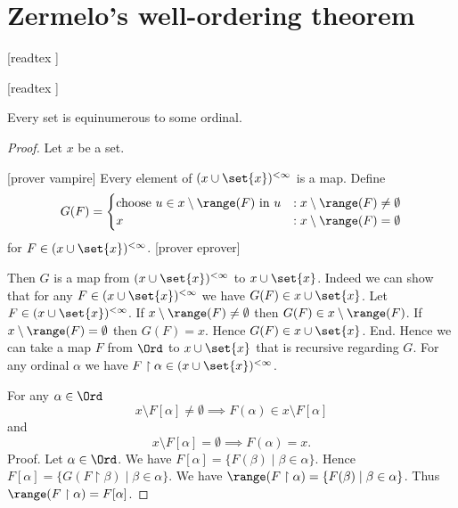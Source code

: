 \documentclass[../set-theory.tex]{subfiles}
\begin{document}
  \chapter{Zermelo's well-ordering theorem}\label{chapter:zermelo}


  \begin{forthel}

    [readtex ]

    [readtex ]

  \end{forthel}


  \begin{forthel}
    \begin{theorem}
      Every set is equinumerous to some ordinal.
    \end{theorem}
    \begin{proof}
      Let $x$ be a set.

      [prover vampire]
      Every element of $(x \cup \set{x})^{< \infty}$ is a map. %
      Define \[ G(F) =
        \begin{cases}
          \text{choose $u \in x \setminus \range(F)$ in $u$}
          & : x \setminus \range(F) \neq \emptyset
          \\
          x
          & : x \setminus \range(F) = \emptyset
        \end{cases} \]
      for $F \in (x \cup \set{x})^{< \infty}$.
      [prover eprover]

      Then $G$ is a map from $(x \cup \set{x})^{< \infty}$ to $x \cup \set{x}$.
      Indeed we can show that for any $F \in (x \cup \set{x})^{< \infty}$ we
      have $G(F) \in x \cup \set{x}$.
        Let $F \in (x \cup \set{x})^{< \infty}$.
        If $x \setminus \range(F) \neq \emptyset$ then
        $G(F) \in x \setminus \range(F)$.
        If $x \setminus \range(F) = \emptyset$ then $G(F) = x$.
        Hence $G(F) \in x \cup \set{x}$.
      End.
      Hence we can take a map $F$ from $\Ord$ to $x \cup \set{x}$ that is
      recursive regarding $G$.
      For any ordinal $\alpha$ we have $F \restriction \alpha \in
      (x \cup \set{x})^{< \infty}$.

      For any $\alpha \in \Ord$
      \[ x \setminus F[\alpha] \neq \emptyset \implies
      F(\alpha) \in x \setminus F[\alpha] \]
      and
      \[ x \setminus F[\alpha] = \emptyset \implies F(\alpha) = x. \]
      Proof.
        Let $\alpha \in \Ord$.
        We have $F[\alpha] = \{ F(\beta) \mid \beta \in \alpha \}$.
        Hence $F[\alpha] = \{ G(F \restriction \beta) \mid \beta \in \alpha \}$.
        We have $\range(F \restriction \alpha) =
        \{ F(\beta) \mid \beta \in \alpha \}$.
        Thus $\range(F \restriction \alpha) = F[\alpha]$.


\end{proof}
\end{forthel}
\end{document}
